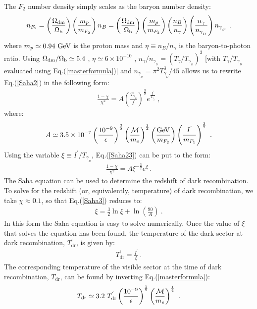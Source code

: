 \documentclass[12pt]{article}
\begin{document}
%
The $F _2$ number density simply scales as the baryon number density:
%
\begin{eqnarray}
n _{F_2} = \left ( \frac{\Omega _{\text{dm}}}{\Omega _{\text b}} \right ) \left ( \frac{m _p}{m _{F_2}} \right ) n _B = \left ( \frac{\Omega _{\text{dm}}}{\Omega _{\text b}} \right ) \left ( \frac{m _p}{m _{F_2}} \right ) \left ( \frac{n _B}{n _{\gamma}} \right ) \left ( \frac{n _{\gamma}}{n _{\gamma _{_D}}} \right ) n _{\gamma _{_D}} \ ,
\label{nf2scale}
\end{eqnarray}
%
where $m _p \simeq 0.94 \ {\rm GeV}$ is the proton mass and $\eta \equiv n _B/n _{\gamma}$ is the baryon-to-photon ratio. Using $\Omega _{\text{dm}}/\Omega _{\text b} \simeq 5.4$ \cite{plax}, $\eta \simeq 6 \times 10 ^{-10}$ \cite{pdg}, $n _{\gamma}/n _{\gamma _{_D}} = \left (T _{\gamma}/T _{\gamma _{_D}} \right ) ^3$ [with $T _{\gamma}/T _{\gamma _{_D}}$ evaluated using Eq.(\ref{masterformula})] and $n _{\gamma _{_D}} = \pi ^2T _{\gamma _{_D}} ^3/45$ allows us to rewrite Eq.(\ref{Saha2}) in the following form:
%
\begin{eqnarray}
\frac{1 - \chi}{\chi ^2} = A \left ( \frac{T _{\gamma _{_D}}}{I ^{'}} \right ) ^{\frac{3}{2}} e ^{\frac{I ^{'}}{T _{\gamma _{_D}}}} \ ,
\label{Saha23}
\end{eqnarray}
%
where:
%
\begin{eqnarray}
A \simeq 3.5 \times 10 ^{-7} \left ( \frac{10 ^{-9}}{\epsilon} \right ) ^{\frac{3}{2}} \left ( \frac{{\cal M}}{m _e} \right ) ^{\frac{3}{4}} \left ( \frac{\rm GeV}{m _{F_2}} \right ) \left ( \frac{I ^{'}}{m _{F_1}} \right ) ^{\frac{3}{2}} \ .
\end{eqnarray}
%
Using the variable $\xi \equiv I ^{'}/T _{\gamma _{_D}}$, Eq.(\ref{Saha23}) can be put to the form:
%
\begin{eqnarray}
\frac{1 - \chi}{\chi ^2} = A \xi ^{-\frac{3}{2}} e ^{\xi} \ .
\label{Saha3}
\end{eqnarray}
%
The Saha equation can be used to determine the redshift of dark recombination. To solve for the redshift (or, equivalently, temperature) of dark recombination, we take $\chi \approx 0.1$, so that Eq.(\ref{Saha3}) reduces to:
%
\begin{eqnarray}
\xi = \frac{3}{2} \ln \xi + \ln \left ( \frac{90}{A} \right ) \ .
\label{sahafinal}
\end{eqnarray}
%
In this form the Saha equation is easy to solve numerically. Once  the value of $\xi$ that solves the equation has been found, the temperature of the dark sector at dark recombination, $T _{\text{dr}} ^{'}$, is given by:
%
\begin{eqnarray}
T _{\text{dr}} ^{'} = \frac{I ^{'}}{\xi} \ .
\label{tdark}
\end{eqnarray}
%
The corresponding temperature of the visible sector at the time of dark recombination, $T _{\text{dr}}$, can be found by inverting Eq.(\ref{masterformula}):
%
\begin{eqnarray}
T _{\text{dr}} \simeq 3.2 \ T _{\text{dr}} ^{'} \left ( \frac{10 ^{-9}}{\epsilon} \right ) ^{\frac{1}{2}} \left ( \frac{{\cal M}}{m _e} \right ) ^{\frac{1}{4}} \ .
\label{darkord}
\end{eqnarray}
%
\end{document}
